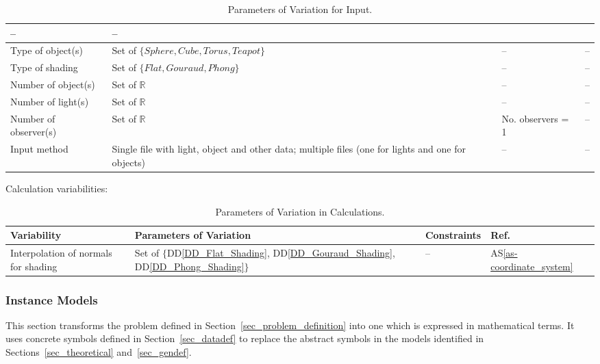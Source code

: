 \documentclass[12pt]{article}
\newcommand{\ddref}[1]{DD\ref{#1}}
\newcommand{\aSref}[1]{AS\ref{#1}}
\begin{document}
\begin{table}[H]
\begin{tabular}{|p{5cm}|p{6cm}|p{4cm}|p{1cm}|}
		-- 
		& --\\
		\hline
		Type of object(s) & Set of $\{Sphere, Cube, Torus, Teapot\}$ & -- & 
		--\\
		\hline
		Type of shading & Set of $\{Flat, Gouraud, Phong\}$ & -- & 
		--\\
		\hline
		Number of object(s) & Set of $\mathbb{R}$ & -- & 
		--\\
		\hline
		Number of light(s) & Set of $\mathbb{R}$ & -- & 
		--\\
		\hline
		Number of observer(s) & Set of $\mathbb{R}$ & No. observers = 1 & 
		--\\
		\hline
		Input method & Single file with light, object and other data; multiple 
		files (one for lights and one for objects) & -- & 
		--\\
		\hline								
	\end{tabular}
	\caption{Parameters of Variation for Input.}
	\label{tbl:Input_Variations}
\end{table}

Calculation variabilities:
\begin{table}[h]
	\centering
	\begin{tabular}{|p{5cm}|p{5cm}|p{2cm}|p{2cm}|}
		\hline
		\textbf{Variability} & \textbf{Parameters of Variation} & Constraints & 
		\textbf{Ref.}\\
		\hline
		Interpolation of normals for shading & Set of 
		$\{$\ddref{DD_Flat_Shading}, \ddref{DD_Gouraud_Shading}, 
		\ddref{DD_Phong_Shading}$\}$ & -- & \aSref{as-coordinate_system} \\
		\hline		
	\end{tabular}
	\caption{Parameters of Variation in Calculations.}
\end{table}

\subsubsection{Instance Models} \label{sec_instance}    

This section transforms the problem defined in 
Section~\ref{sec_problem_definition} into one which is expressed in 
mathematical terms. It uses concrete symbols defined in 
Section~\ref{sec_datadef} to replace the abstract symbols in the models 
identified in Sections~\ref{sec_theoretical} and~\ref{sec_gendef}.

~\newline

\end{document}
